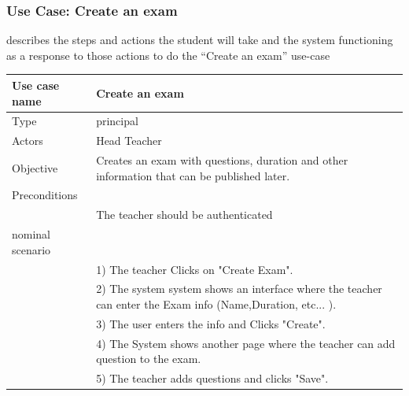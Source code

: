 \documentclass[]{uc2pfecaneva}
\begin{document}
\subsubsection{Use Case: Create an exam}
    describes the steps and actions the student will take and the system functioning as a response
    to those actions to do the “Create an exam” use-case
    \begin{table}[h]
        \begin{tabularx}{\textwidth}{|l|X|}
            \hline
            Use case name         & Create an exam                                                                                              \\ \hline
            Type                  & principal                                                                                                   \\ \hline
            Actors                & Head Teacher                                                                                                \\ \hline
            Objective             & Creates an exam with questions, duration and other information that can be published later.                 \\ \hline
            Preconditions         &                                                                                                             \\
            & The teacher should be authenticated                                                                         \\ \hline
            nominal scenario      &                                                                                                             \\
            & 1) The teacher Clicks on "Create Exam".                                                                     \\
            & 2) The system system shows an interface where the teacher can enter the Exam info (Name,Duration, etc... ). \\
            & 3) The user enters the info and Clicks "Create".                                                            \\
            & 4) The System shows another page where the teacher can add question to the exam.                            \\
            & 5) The teacher  adds questions and clicks "Save".                                                           \\ \hline

\end{tabularx}
\end{table}
\end{document}
